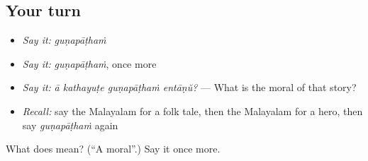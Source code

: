 \subsection*{Your turn}
\begin{itemize}
\raggedright
  \item \emph{Say it:} \emph{guṇapāṭhaṁ}
  \item \emph{Say it:} \emph{guṇapāṭhaṁ}, once more
  \item \emph{Say it:} \emph{ā kathayuṭe guṇapāṭhaṁ entāṇŭ?} — What is the moral of that story?
  \item \emph{Recall:} say the Malayalam for a folk tale, then the Malayalam for a hero, then say \emph{guṇapāṭhaṁ} again
\end{itemize}

\begin{tcolorbox}[breakable,colback=teal!4,colframe=teal!35!black,title={Before you move on}]
What does  mean? (\textquotedblleft{}A moral\textquotedblright{}.) Say it once more.
\end{tcolorbox}
